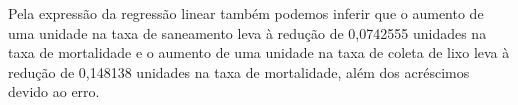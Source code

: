 Pela expressão da regressão linear também podemos inferir que o aumento de uma unidade na taxa de saneamento leva à redução de 0,0742555 unidades na taxa de mortalidade e o aumento
de uma unidade na taxa de coleta de lixo leva à redução de 0,148138 unidades na taxa de mortalidade, além dos acréscimos devido ao erro.

